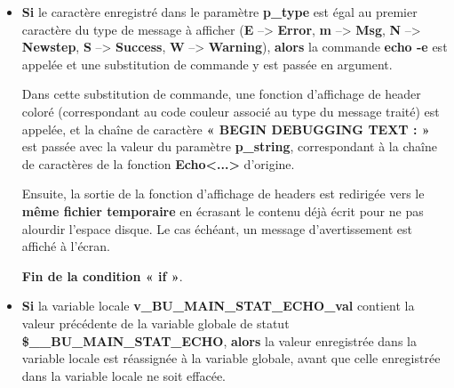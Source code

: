 \documentclass[a4paper,10pt]{article}
\begin{document}
\begin{itemize}
{\begin{itemize}
            \item
            {
                \setlength{\parskip}{2em}

                \begin{justify}
                    \textbf{\color{cond}Si} le caractère enregistré dans le paramètre \textbf{\color{vars}p\_type} est égal au premier caractère du type de message à afficher (\textbf{E} --> \textbf{Error}, \textbf{m} --> \textbf{Msg}, \textbf{N} --> \textbf{Newstep}, \textbf{S} --> \textbf{Success}, \textbf{W} --> \textbf{Warning}), \textbf{\color{cond}alors} la commande \textbf{\color{cmds}echo -e} est appelée et une substitution de commande y est passée en argument.
                \end{justify}

                \setlength{\parskip}{1em}

                \begin{justify}
                    Dans cette substitution de commande, une fonction d'affichage de header coloré (correspondant au code couleur associé au type du message traité) est appelée, et la chaîne de caractère \textbf{« BEGIN DEBUGGING TEXT : »} est passée avec la valeur du paramètre \textbf{\color{vars}p\_string}, correspondant à la chaîne de caractères de la fonction \textbf{\color{func}Echo<...>} d'origine.
                \end{justify}
                
                \begin{justify}
                    Ensuite, la sortie de la fonction d'affichage de headers est redirigée vers le \textbf{\color{path}même fichier temporaire} en écrasant le contenu déjà écrit pour ne pas alourdir l'espace disque. Le cas échéant, un message d'avertissement est affiché à l'écran.
                \end{justify}

                \begin{justify}
                    \textbf{\color{cond}Fin de la condition « if »}.
                \end{justify}
            }

            \item
            {
                \setlength{\parskip}{2em}

                \begin{justify}
                    \textbf{\color{cond}Si} la variable locale \textbf{\color{vars}v\_BU\_MAIN\_STAT\_ECHO\_val} contient la valeur précédente de la variable globale de statut \textbf{\color{vars}\$\_\_BU\_MAIN\_STAT\_ECHO}, \textbf{\color{cond}alors} la valeur enregistrée dans la variable locale est réassignée à la variable globale, avant que celle enregistrée dans la variable locale ne soit effacée.
                \end{justify}\setlength{\parskip}{1em}
                
}
\end{itemize}}
\end{itemize}
\end{document}
